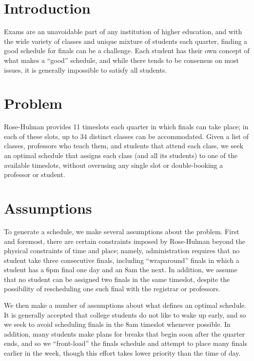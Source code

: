 \documentclass{article}
\begin{document}

\section{Introduction}

Exams are an unavoidable part of any institution of higher education, and with the wide variety of classes and unique mixture of students each quarter, finding a good schedule for finals can be a challenge. Each student has their own concept of what makes a ``good'' schedule, and while there tends to be consensus on most issues, it is generally impossible to satisfy all students.

\section{Problem}

Rose-Hulman provides 11 timeslots each quarter in which finals can take place; in each of these slots, up to 34 distinct classes can be accommodated. Given a list of classes, professors who teach them, and students that attend each class, we seek an optimal schedule that assigns each class (and all its students) to one of the available timeslots, without overusing any single slot or double-booking a professor or student.

\section{Assumptions}

To generate a schedule, we make several assumptions about the problem. First and foremost, there are certain constraints imposed by Rose-Hulman beyond the physical constraints of time and place; namely, administration requires that no student take three consecutive finals, including ``wraparound'' finals in which a student has a 6pm final one day and an 8am the next. In addition, we assume that no student can be assigned two finals in the same timeslot, despite the possibility of rescheduling one such final with the registrar or professors.

We then make a number of assumptions about what defines an optimal schedule. It is generally accepted that college students do not like to wake up early, and so we seek to avoid scheduling finals in the 8am timeslot whenever possible. In addition, many students make plans for breaks that begin soon after the quarter ends, and so we ``front-load'' the finals schedule and attempt to place many finals earlier in the week, though this effort takes lower priority than the time of day.
\end{document}
